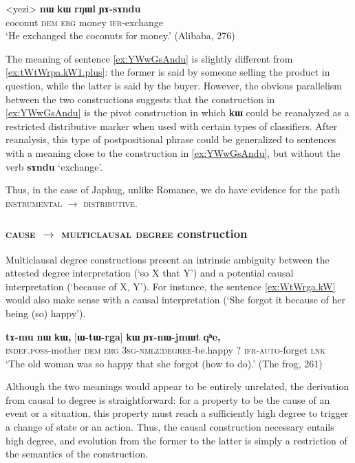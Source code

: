 \documentclass[oldfontcommands,oneside,a4paper,11pt]{article}
\newcommand{\ipa}[1]{{\phon\textbf{#1}}}
\begin{document}
  \begin{exe}
\ex \label{ex:YAsAndu}
\gll 
<yezi> 	\ipa{nɯ}  	\ipa{kɯ}  	\ipa{rŋɯl}  	\ipa{ɲɤ-sɤndu}  \\
coconut \textsc{dem} \textsc{erg} money \textsc{ifr}-exchange  \\
\glt `He exchanged the coconuts for money.' (Alibaba, 276)
\end{exe}

The meaning of sentence \ref{ex:YWwGsAndu} is slightly different from \ref{ex:tWtWrpa.kW1.plus}: the former is  said by someone selling the product in question, while the latter is said by the buyer. However, the obvious parallelism between the two constructions suggests that the construction in \ref{ex:YWwGsAndu} is the pivot construction in which  \ipa{kɯ} could be reanalyzed as a restricted distributive marker when used with certain types of classifiers. After reanalysis, this type of postpositional phrase could be generalized to sentences with a meaning close to the construction in \ref{ex:YWwGsAndu}, but without the verb  \ipa{sɤndu} `exchange'.


Thus, in the case of Japhug, unlike Romance, we do have evidence for the path \textsc{instrumental} $\rightarrow$ \textsc{distributive}.
  

\subsubsection{\textsc{cause} $\rightarrow$ \textsc{multiclausal degree} construction} \label{sec:cause2degree}

Multiclausal degree constructions  present an intrinsic ambiguity between the attested degree interpretation (`so X that Y') and a potential causal interpretation (`because of X, Y').  For instance, the sentence \ref{ex:WtWrga.kW} would also make sense  with a causal interpretation (`She forgot it because of her being (so) happy').

 \begin{exe} 
 \ex \label{ex:WtWrga.kW}
\gll 
\ipa{tɤ-mu}  	\ipa{nɯ}  	\ipa{kɯ,}  	  	[\ipa{ɯ-tɯ-rga}]  	\ipa{kɯ}  	\ipa{ɲɤ-nɯ-jmɯt}  	\ipa{qʰe,}  \\
\textsc{indef.poss}-mother \textsc{dem} \textsc{erg} \textsc{3sg-nmlz:degree}-be.happy ?{ } \textsc{ifr-auto}-forget  \textsc{lnk} \\
\glt `The old woman was so happy that she forgot (how to do).' (The frog, 261)
 \end{exe} 
 
 
Although the two meanings would appear to be entirely unrelated, the derivation from causal to degree is straightforward: for a property to be the cause of an event or a situation, this property must reach a sufficiently high degree to trigger a change of state or an action. Thus,  the causal construction necessary entails high degree, and evolution from the former to the latter is simply a restriction of the semantics of the construction.
\end{document}
